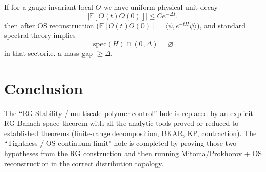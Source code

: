 If for a gauge-invariant local $O$ we have uniform physical-unit decay
\[
|\mathbb E[O(t)O(0)]|\le C e^{-\Delta t},
\]
then after OS reconstruction ($\mathbb E[O(t)O(0)]=\langle \psi,e^{-tH}\psi\rangle$), and standard spectral theory implies
\[
\mathrm{spec}(H)\cap(0,\Delta)=\varnothing
\]
in that sectori.e. a mass gap $\ge \Delta$.

\section{Conclusion}
The ``RG-Stability / multiscale polymer control'' hole is replaced by an explicit RG Banach-space theorem with all the analytic tools proved or reduced to established theorems (finite-range decomposition, BKAR, KP, contraction).
The ``Tightness / OS continuum limit'' hole is completed by proving those two hypotheses from the RG construction and then running Mitoma/Prokhorov + OS reconstruction in the correct distribution topology.
